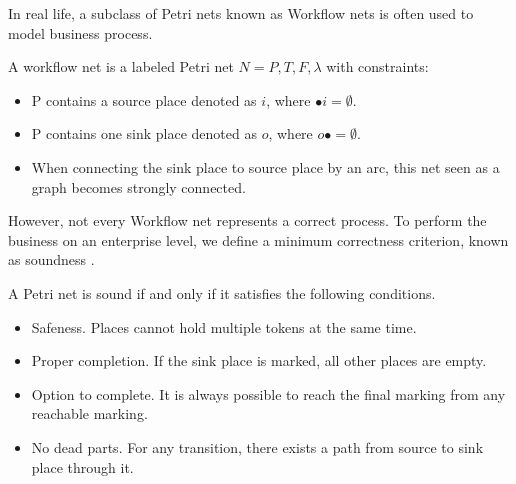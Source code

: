 In real life, a subclass of Petri nets known as Workflow nets is often used to model business process.
\begin{definition}
	A workflow net is a labeled Petri net $N={P,T,F,\lambda}$ with constraints: 
	\begin{itemize}
		\itemsep-0.5em 
		\item P contains a source place denoted as $i$, where $ \bullet i=\emptyset$.
		\item P contains one sink place denoted as $o$, where $ o\bullet =\emptyset$.
		\item When connecting the sink place to source place by an arc, this net seen as a graph becomes strongly connected.
	\end{itemize}
\end{definition}   
However, not every Workflow net represents a correct process. To perform the business on an enterprise level, we define a minimum correctness criterion, known as soundness \cite{van2006structural}. 
\begin{definition}[Soundness]
	A Petri net is sound if and only if it satisfies the following conditions.
	\begin{itemize}
		\itemsep-0.5em 
		\item Safeness. Places cannot hold multiple tokens at the same time.
		\item Proper completion. If the sink place is marked, all other places are empty.
		\item Option to complete. It is always possible to reach the final marking from any reachable marking.
		\item No dead parts. For any transition, there exists a path from source to sink place through it. 
	\end{itemize}
\end{definition}
